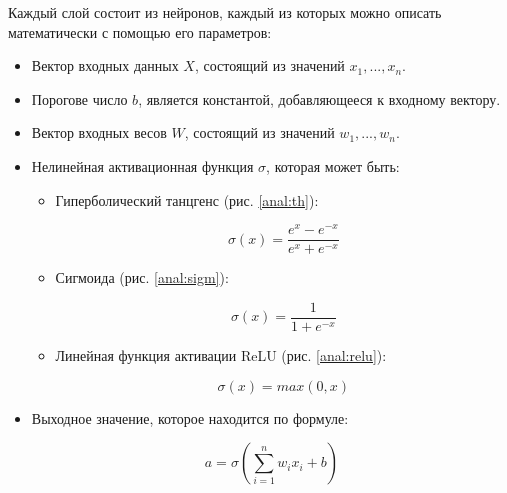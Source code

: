 Каждый слой состоит из нейронов, каждый из которых можно описать математически с помощью его параметров:

\begin{itemize}
	\item Вектор входных данных $X$, состоящий из значений $x_1, ..., x_n$.
	\item Порогове число $b$, является константой, добавляющееся к входному вектору.
	\item Вектор входных весов $W$, состоящий из значений $w_1, ..., w_n$.
	\item Нелинейная активационная функция $\sigma$, которая может быть:
	\begin{itemize}
		\item Гиперболический танцгенс (рис. \ref{anal:th}):
		
		\begin{equation}
			\sigma(x) = \frac{e^x - e^{-x}}{e^x + e^{-x}}
		\end{equation}
		
		
		\item Сигмоида (рис. \ref{anal:sigm}):
		
		\begin{equation}
		\sigma(x)=\frac{1}{1+e^{-x}}
		\end{equation}
		
		
		\item Линейная функция активации ReLU (рис. \ref{anal:relu}):
		
		\begin{equation}
		\sigma(x) = max(0, x)
		\end{equation}
		
		
	\end{itemize}
	\item Выходное значение, которое находится по формуле:
	
	\begin{equation}
	a = \sigma( \sum_{i=1}^{n}w_ix_i + b )
	\end{equation}
	
\end{itemize}


